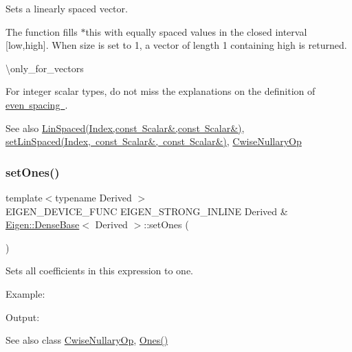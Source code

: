 Sets a linearly spaced vector. 

The function fills {\ttfamily $\ast$this} with equally spaced values in the closed interval \mbox{[}low,high\mbox{]}. When size is set to 1, a vector of length 1 containing \textquotesingle{}high\textquotesingle{} is returned.

\textbackslash{}only\+\_\+for\+\_\+vectors

For integer scalar types, do not miss the explanations on the definition of \mbox{\hyperlink{class_eigen_1_1_dense_base_a513c7986f48517c36f992a558f81e591}{even spacing }}.

\begin{DoxySeeAlso}{See also}
\mbox{\hyperlink{class_eigen_1_1_dense_base_a513c7986f48517c36f992a558f81e591}{Lin\+Spaced(\+Index,const Scalar\&,const Scalar\&)}}, \mbox{\hyperlink{class_eigen_1_1_dense_base_a17a69cfd1b44b64f26b1a0f00666a871}{set\+Lin\+Spaced(\+Index, const Scalar\&, const Scalar\&)}}, \mbox{\hyperlink{class_eigen_1_1_cwise_nullary_op}{Cwise\+Nullary\+Op}} 
\end{DoxySeeAlso}
\mbox{\label{class_eigen_1_1_dense_base_ad18970fd7d9f9c3d8db9d05fa8652a25}} 
\subsubsection{\texorpdfstring{setOnes()}{setOnes()}}
{\footnotesize\ttfamily template$<$typename Derived $>$ \\
E\+I\+G\+E\+N\+\_\+\+D\+E\+V\+I\+C\+E\+\_\+\+F\+U\+NC E\+I\+G\+E\+N\+\_\+\+S\+T\+R\+O\+N\+G\+\_\+\+I\+N\+L\+I\+NE Derived \& \mbox{\hyperlink{class_eigen_1_1_dense_base}{Eigen\+::\+Dense\+Base}}$<$ Derived $>$\+::set\+Ones (\begin{DoxyParamCaption}{ }\end{DoxyParamCaption})}

Sets all coefficients in this expression to one.

Example\+: 
\begin{DoxyCodeInclude}{0}
\end{DoxyCodeInclude}
 Output\+: 
\begin{DoxyVerbInclude}
\end{DoxyVerbInclude}


\begin{DoxySeeAlso}{See also}
class \mbox{\hyperlink{class_eigen_1_1_cwise_nullary_op}{Cwise\+Nullary\+Op}}, \mbox{\hyperlink{class_eigen_1_1_dense_base_a1284a38971d817c33e40c226f6347e37}{Ones()}} 
\end{DoxySeeAlso}
\mbox{\label{class_eigen_1_1_dense_base_ac476e5852129ba32beaa1a8a3d7ee0db}} 
